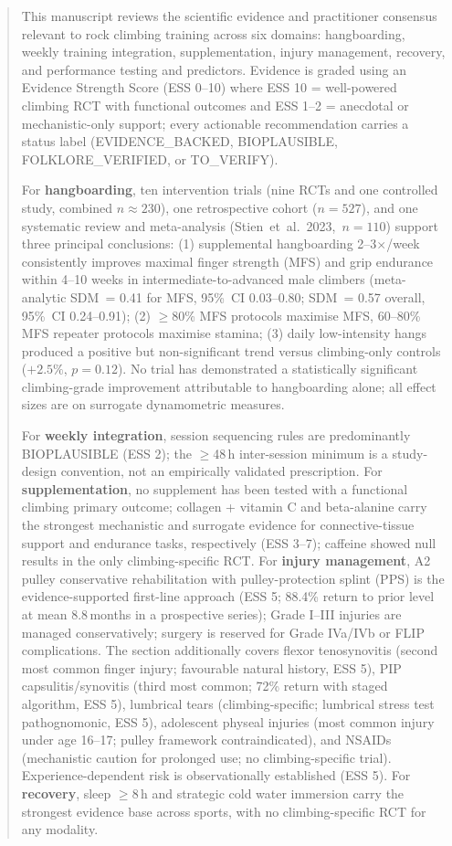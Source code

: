 \begin{abstract}
This manuscript reviews the scientific evidence and practitioner consensus relevant to rock climbing training across six domains: hangboarding, weekly training integration, supplementation, injury management, recovery, and performance testing and predictors. Evidence is graded using an Evidence Strength Score (ESS 0--10) where ESS 10 = well-powered climbing RCT with functional outcomes and ESS 1--2 = anecdotal or mechanistic-only support; every actionable recommendation carries a status label (EVIDENCE\_BACKED, BIOPLAUSIBLE, FOLKLORE\_VERIFIED, or TO\_VERIFY).

For \textbf{hangboarding}, ten intervention trials (nine RCTs and one controlled study, combined $n \approx 230$), one retrospective cohort ($n = 527$), and one systematic review and meta-analysis \mbox{(Stien et~al.\ 2023, $n = 110$)} support three principal conclusions: (1) supplemental hangboarding 2--3$\times$/week consistently improves maximal finger strength (MFS) and grip endurance within 4--10 weeks in intermediate-to-advanced male climbers (meta-analytic SDM~= 0.41 for MFS, 95\%~CI 0.03--0.80; SDM~= 0.57 overall, 95\%~CI 0.24--0.91); (2) $\geq$80\% MFS protocols maximise MFS, 60--80\% MFS repeater protocols maximise stamina; (3) daily low-intensity hangs produced a positive but non-significant trend versus climbing-only controls ($+2.5\%$, $p = 0.12$). No trial has demonstrated a statistically significant climbing-grade improvement attributable to hangboarding alone; all effect sizes are on surrogate dynamometric measures.

For \textbf{weekly integration}, session sequencing rules are predominantly BIOPLAUSIBLE (ESS 2); the $\geq$48\,h inter-session minimum is a study-design convention, not an empirically validated prescription. For \textbf{supplementation}, no supplement has been tested with a functional climbing primary outcome; collagen + vitamin C and beta-alanine carry the strongest mechanistic and surrogate evidence for connective-tissue support and endurance tasks, respectively (ESS 3--7); caffeine showed null results in the only climbing-specific RCT. For \textbf{injury management}, A2 pulley conservative rehabilitation with pulley-protection splint (PPS) is the evidence-supported first-line approach (ESS 5; 88.4\% return to prior level at mean 8.8\,months in a prospective series); Grade I--III injuries are managed conservatively; surgery is reserved for Grade IVa/IVb or FLIP complications. The section additionally covers flexor tenosynovitis (second most common finger injury; favourable natural history, ESS 5), PIP capsulitis/synovitis (third most common; 72\% return with staged algorithm, ESS 5), lumbrical tears (climbing-specific; lumbrical stress test pathognomonic, ESS 5), adolescent physeal injuries (most common injury under age 16--17; pulley framework contraindicated), and NSAIDs (mechanistic caution for prolonged use; no climbing-specific trial). Experience-dependent risk is observationally established (ESS 5). For \textbf{recovery}, sleep $\geq$8\,h and strategic cold water immersion carry the strongest evidence base across sports, with no climbing-specific RCT for any modality.


\end{abstract}
